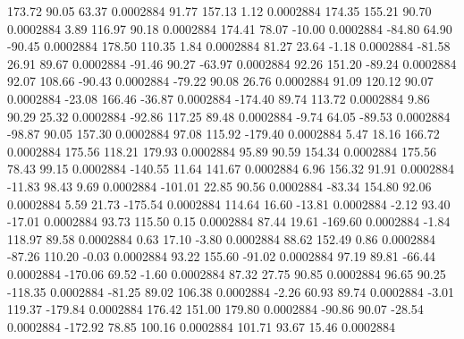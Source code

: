       173.72       90.05       63.37     0.0002884
       91.77      157.13        1.12     0.0002884
      174.35      155.21       90.70     0.0002884
        3.89      116.97       90.18     0.0002884
      174.41       78.07      -10.00     0.0002884
      -84.80       64.90      -90.45     0.0002884
      178.50      110.35        1.84     0.0002884
       81.27       23.64       -1.18     0.0002884
      -81.58       26.91       89.67     0.0002884
      -91.46       90.27      -63.97     0.0002884
       92.26      151.20      -89.24     0.0002884
       92.07      108.66      -90.43     0.0002884
      -79.22       90.08       26.76     0.0002884
       91.09      120.12       90.07     0.0002884
      -23.08      166.46      -36.87     0.0002884
     -174.40       89.74      113.72     0.0002884
        9.86       90.29       25.32     0.0002884
      -92.86      117.25       89.48     0.0002884
       -9.74       64.05      -89.53     0.0002884
      -98.87       90.05      157.30     0.0002884
       97.08      115.92     -179.40     0.0002884
        5.47       18.16      166.72     0.0002884
      175.56      118.21      179.93     0.0002884
       95.89       90.59      154.34     0.0002884
      175.56       78.43       99.15     0.0002884
     -140.55       11.64      141.67     0.0002884
        6.96      156.32       91.91     0.0002884
      -11.83       98.43        9.69     0.0002884
     -101.01       22.85       90.56     0.0002884
      -83.34      154.80       92.06     0.0002884
        5.59       21.73     -175.54     0.0002884
      114.64       16.60      -13.81     0.0002884
       -2.12       93.40      -17.01     0.0002884
       93.73      115.50        0.15     0.0002884
       87.44       19.61     -169.60     0.0002884
       -1.84      118.97       89.58     0.0002884
        0.63       17.10       -3.80     0.0002884
       88.62      152.49        0.86     0.0002884
      -87.26      110.20       -0.03     0.0002884
       93.22      155.60      -91.02     0.0002884
       97.19       89.81      -66.44     0.0002884
     -170.06       69.52       -1.60     0.0002884
       87.32       27.75       90.85     0.0002884
       96.65       90.25     -118.35     0.0002884
      -81.25       89.02      106.38     0.0002884
       -2.26       60.93       89.74     0.0002884
       -3.01      119.37     -179.84     0.0002884
      176.42      151.00      179.80     0.0002884
      -90.86       90.07      -28.54     0.0002884
     -172.92       78.85      100.16     0.0002884
      101.71       93.67       15.46     0.0002884
